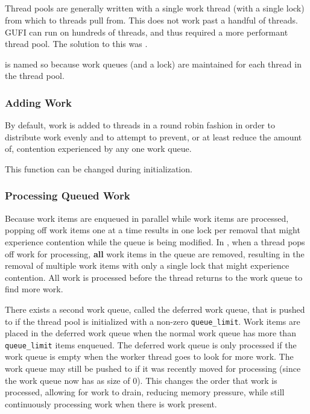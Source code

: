 \subsection{\qptp}
Thread pools are generally written with a single work thread (with a
single lock) from which to threads pull from. This does not work past
a handful of threads. GUFI can run on hundreds of threads, and thus
required a more performant thread pool. The solution to this was
\qptp.

\qptp is named so because work queues (and a lock) are maintained for
each thread in the thread pool.

\subsubsection{Adding Work}
By default, work is added to threads in a round robin fashion in order
to distribute work evenly and to attempt to prevent, or at least
reduce the amount of, contention experienced by any one work queue.

This function can be changed during initialization.

\subsubsection{Processing Queued Work}
Because work items are enqueued in parallel while work items are
processed, popping off work items one at a time results in one lock
per removal that might experience contention while the queue is being
modified. In \qptp, when a thread pops off work for processing, {\bf
 all} work items in the queue are removed, resulting in the removal
of multiple work items with only a single lock that might experience
contention. All work is processed before the thread returns to the
work queue to find more work.

There exists a second work queue, called the deferred work queue, that
is pushed to if the thread pool is initialized with a non-zero
\texttt{queue\_limit}. Work items are placed in the deferred work
queue when the normal work queue has more than \texttt{queue\_limit}
items enqueued. The deferred work queue is only processed if the work
queue is empty when the worker thread goes to look for more work. The
work queue may still be pushed to if it was recently moved for
processing (since the work queue now has as size of 0). This changes
the order that work is processed, allowing for work to drain, reducing
memory pressure, while still continuously
processing work when there is work present.

